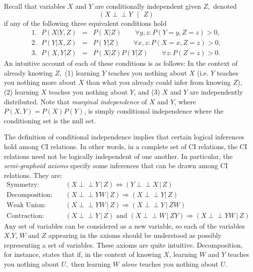 \documentclass[letterpaper,onecolumn,nofootinbib]{revtex4}
\def\indep{\perp\!\!\!\!\perp}
\begin{document}
Recall that variables $X$ and $Y$ are
conditionally independent given $Z,$ denoted
\begin{equation*}
(X\indep Y\text{ }|\text{ }Z)
\end{equation*}%
if any of the following three equivalent conditions hold 
\begin{eqnarray*}
1.\text{ }P(X|Y,Z) &=&P(X|Z)\qquad\forall y,z:P(Y=y,Z=z)>0, \\
2.\text{ }P(Y|X,Z) &=&P(Y|Z)\qquad\forall x,z:P(X=x,Z=z)>0, \\
3.\text{ }P(X,Y|Z) &=&P(X|Z)P(Y|Z)\qquad\forall z: P(Z=z)>0.
\end{eqnarray*}%
An intuitive account of each of these conditions is as follows: In the
context of already knowing $Z,$ (1) learning $Y$ teaches you nothing about $%
X $ (i.e. $Y$ teaches you nothing more about $X$ than what you already could
infer from knowing $Z$), (2) learning $X$ teaches you nothing about $Y$, and
(3) $X$ and $Y$ are independently distributed.  Note that \emph{marginal independence} of $X$ and $Y$, where $P(X,Y)=P(X)P(Y)$, is simply conditional independence where the conditioning set is the null set.

The definition of conditional independence implies that certain logical inferences hold among CI relations. In other words, in a complete set of CI relations, the CI relations need not be logically independent of one another.  In particular, the
\emph{semi-graphoid axioms} specify some inferences that can be drawn among CI
relations. They are:
\begin{eqnarray*}
\mbox{Symmetry: } 		&&	(X\indep Y\, |\,Z) 		\Leftrightarrow 		(Y\indep X\, |\,Z)\\
\mbox{Decomposition: } 	&& 	(X\indep YW\,|\,Z) 	\Rightarrow 		(X \indep Y |\,Z) \\
\mbox{Weak Union: } 	&&	(X\indep YW\,|\,Z)	\Rightarrow 		(X \indep Y \,| \, ZW) \\
\mbox{Contraction: } 	&&	(X \indep Y\,|\,Z) 	\mbox{ and }		 	(X\indep W\, |\, ZY)	\Rightarrow (X\indep YW \,|\,Z)
\end{eqnarray*}
Any set of variables can be considered as a new variable, so each of the variables $X$,$Y$, $W$ and $Z$ appearing in the axioms should be understood as possibly representing a set of variables.  These axioms are quite intuitive.  Decomposition, for instance, states that if, in the context of knowing $X$,
learning $W$ and $Y$ teaches you nothing about $U,$ then learning $W$ \emph{
alone }teaches you nothing about $U$.
\end{document}
